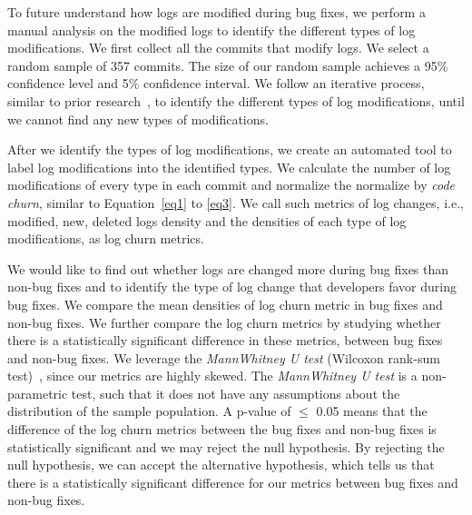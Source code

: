 
To future understand how logs are modified during bug fixes, we perform a manual analysis on the modified logs to identify the different types of log modifications. We first collect all the commits that modify logs. We select a random sample of 357 commits. The size of our random sample achieves a 95\% confidence level and 5\% confidence interval. We follow an iterative process, similar to prior research~\cite{seaman1999qualitative}, to identify the different types of log modifications, until we cannot find any new types of modifications. 

After we identify the types of log modifications, we create an automated tool to label log modifications into the identified types. We calculate the number of log modifications of every type in each commit and normalize the normalize by {\em code churn}, similar to Equation~\ref{eq1} to \ref{eq3}. We call such metrics of log changes, i.e., modified, new, deleted logs density and the densities of each type of log modifications, as log churn metrics.




We would like to find out whether logs are changed more during bug fixes than non-bug fixes and to identify the type of log change that developers favor during bug fixes. We compare the mean densities of log churn metric in bug fixes and non-bug fixes. We further compare the log churn metrics by studying whether there is a statistically significant difference in these metrics, between bug fixes and non-bug fixes. We leverage the \textsl{MannWhitney U test} (Wilcoxon rank-sum test)~\cite{Gehan1965}, since our metrics are highly skewed. The {\em MannWhitney U test} is a non-parametric test, such that it does not have any assumptions about the distribution of the sample population. A p-value of \ensuremath{\le} 0.05 means that the difference of the log churn metrics between the bug fixes and non-bug fixes is statistically significant and we may reject the null hypothesis. By rejecting the null hypothesis, we can accept the alternative hypothesis, which tells us that there is a statistically significant difference for our metrics between bug fixes and non-bug fixes.

